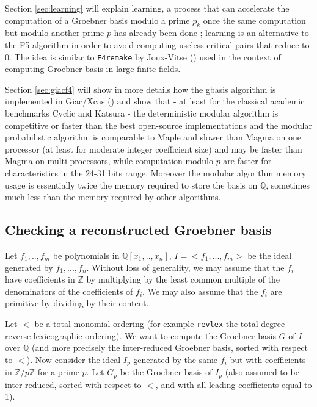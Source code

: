 \documentclass[a4paper,11pt]{article}
\begin{document}
\begin{giacjshere}
Section \ref{sec:learning}
 will explain learning, a process that can accelerate the
computation of a Groebner basis modulo a prime $p_k$ once the
same computation but modulo another prime $p$ has already been
done ; learning is an alternative to the F5 algorithm
in order to avoid computing useless critical pairs that reduce to 0. The
idea is similar to {\tt F4remake} by Joux-Vitse (\cite{joux2011variant}) 
used in the context of computing Groebner basis in large finite fields.

Section \ref{sec:giacf4} 
will show in more details how the gbasis algorithm is implemented
in Giac/Xcas (\cite{giac}) and show that - at least for the classical academic
benchmarks Cyclic and Katsura - the deterministic modular algorithm
is competitive or faster than the best open-source implementations
and the modular probabilistic algorithm is comparable to Maple
and slower than Magma on one processor (at least for moderate integer coefficient
size) and may be faster than Magma on multi-processors, 
while computation modulo $p$ are faster for characteristics in the
24-31 bits range.
Moreover the modular algorithm memory usage is essentially
twice the memory required to store the basis on $\mathbb{Q}$, sometimes
much less than the memory required by other algorithms.

\subsection{Checking a reconstructed Groebner basis} \label{sec:probagb}
Let $f_1,..,f_m$ be polynomials in $\mathbb{Q}[x_1,..,x_n]$, $I=<f_1,...,f_m>$
be the ideal generated by $f_1,...,f_n$. Without loss of generality, we may
assume that the $f_i$ have coefficients in $\mathbb{Z}$ by multiplying
by the least common multiple of the denominators of the coefficients
of $f_i$. We may also assume that the $f_i$ are primitive by dividing
by their content.

Let $<$ be a total monomial ordering (for example {\tt revlex} the
total degree reverse lexicographic ordering). We want to compute
the Groebner basis $G$ of $I$ over $\mathbb{Q}$ (and more precisely
the inter-reduced Groebner basis, sorted with respect to $<$).
Now consider the ideal $I_p$ generated by the same $f_i$ but with
coefficients in $\mathbb{Z}/p\mathbb{Z}$ for a prime $p$. Let $G_p$ be the Groebner basis of $I_p$
(also assumed to be inter-reduced, sorted with respect to $<$, and with
all leading coefficients equal to 1).


\end{giacjshere}
\end{document}
